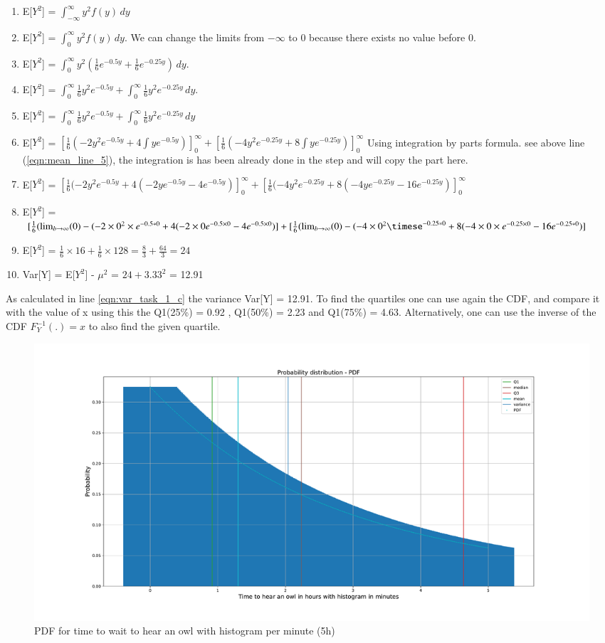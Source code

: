 \begin{enumerate}
    \item E[$Y^2$] = $\int_{-\infty}^{\infty}y^2f(y)\,dy$
    \item E[$Y^2$] = $\int_{0}^{\infty} y^2f(y)\,dy$.  We can change the limits from $-\infty$ to 0 because there exists no value before 0.
    \item E[$Y^2$] = $\int_{0}^{\infty} y^2(\frac{1}{6}e^{-0.5y} + \frac{1}{6}e^{-0.25y})\,dy$.
    \item E[$Y^2$] = $\int_{0}^{\infty} \frac{1}{6}y^2e^{-0.5y} + \int_{0}^{\infty} \frac{1}{6}y^2e^{-0.25y}\,dy$.
    \item E[$Y^2$] = $\int_{0}^{\infty} \frac{1}{6}y^2e^{-0.5y} + \int_{0}^{\infty} \frac{1}{6}y^2e^{-0.25y}\,dy$
    \item E[$Y^2$] = $[\frac{1}{6}(-2y^2e^{-0.5y}+4\int ye^{-0.5y})]_0^\infty + [\frac{1}{6}(-4y^2e^{-0.25y}+8\int ye^{-0.25y})]_0^\infty$ Using integration by parts formula. see above line (\ref{eqn:mean_line_5}), the integration is has been already done in the step and will copy the part here.
    \item E[$Y^2$] = $[\frac{1}{6}(-2y^2e^{-0.5y} +4(-2ye^{-0.5y}-4e^{-0.5y})]_0^\infty + [\frac{1}{6}(-4y^2e^{-0.25y} +8(-4ye^{-0.25y}-16e^{-0.25y})]_0^\infty$
    \item E[$Y^2$] = $[\frac{1}{6}(\lim_{b\to\infty}(0)-(-2\times 0^2 \times e^{-0.5*0} +4(-2\times0e^{-0.5\times0}-4e^{-0.5\times0})] + [\frac{1}{6}(\lim_{b\to\infty}(0)-(-4\times0^2 \timese^{-0.25*0} +8(-4\times0 \times e^{-0.25\times 0}-16e^{-0.25*0})]$
    \item E[$Y^2$] = $\frac{1}{6}\times 16 + \frac{1}{6}\times 128 = \frac{8}{3} + \frac{64}{3} = 24$
    \item Var[Y] = E[$Y^2$] - $\mu^2$ = $24 + 3.33^2$ = 12.91 \label{eqn:var_task_1_c}
\end{enumerate}
As calculated in line \ref{eqn:var_task_1_c} the variance Var[Y] = 12.91. To find the quartiles one can use again the CDF, and compare it with the value of x using this the Q1(25\%) = 0.92 , Q1(50\%) = 2.23 and Q1(75\%) = 4.63. Alternatively, one can use the inverse of the CDF $F_{Y}^{-1} (.)=x$ to also find the given quartile.

\begin{figure}[h!]
\centering
\includegraphics[width=\textwidth]{pics/task_1_c_pdf.pdf}
\caption{PDF for time to wait to hear an owl with histogram per minute (5h)}\label{fig:task_1_c}
\end{figure}
\FloatBarrier    


